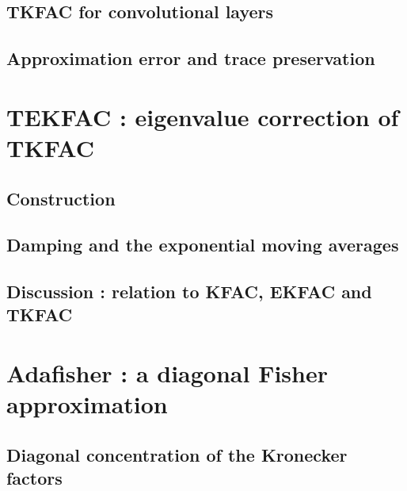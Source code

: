 \documentclass[11pt]{report}
\numberwithin{equation}{chapter}
\theoremstyle{plain}
\theoremstyle{remark}
\begin{document}
\subsection{TKFAC for convolutional layers}
\mbox{}\par

\subsection{Approximation error and trace preservation}
\mbox{}\par

\section{TEKFAC : eigenvalue correction of TKFAC}
\mbox{}\par

\subsection{Construction}
\mbox{}\par

\subsection{Damping and the exponential moving averages}
\mbox{}\par

\subsection{Discussion : relation to KFAC, EKFAC and TKFAC}
\mbox{}\par

\section{Adafisher : a diagonal Fisher approximation}
\mbox{}\par

\subsection{Diagonal concentration of the Kronecker factors}
\mbox{}\par
\end{document}
